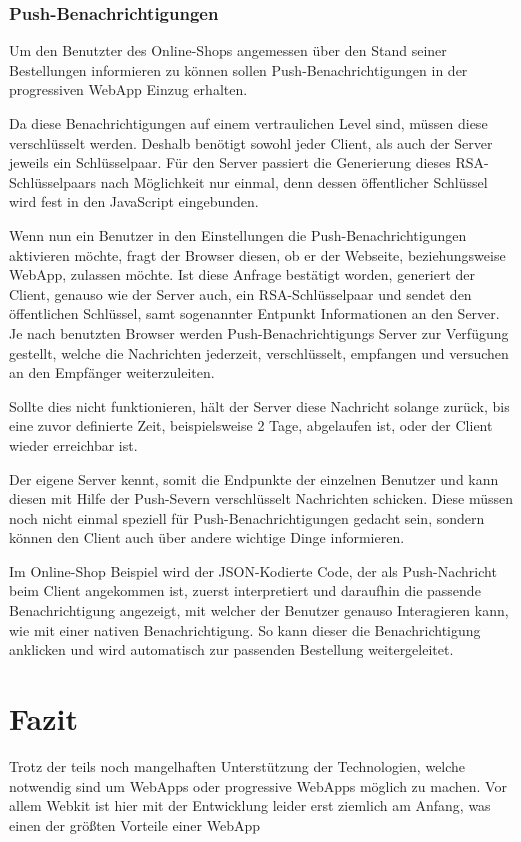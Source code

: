 \documentclass[a4paper,12pt,ngerman,listof=numbered]{scrartcl}      %
\begin{document}
	\subsubsection{Push-Benachrichtigungen}
	Um den Benutzter des Online-Shops angemessen über den Stand seiner Bestellungen informieren zu können sollen Push-Benachrichtigungen in der progres\-siven WebApp Einzug erhalten.\par
	Da diese Benachrichtigungen auf einem vertraulichen Level sind, müssen diese verschlüsselt werden. Deshalb benötigt sowohl jeder Client, als auch der Server jeweils ein Schlüsselpaar. Für den Server passiert die Generierung dieses RSA-Schlüsselpaars nach Möglichkeit nur einmal, denn dessen öffentlicher Schlüssel wird fest in den JavaScript eingebunden.\par
	Wenn nun ein Benutzer in den Einstellungen die Push-Be\-nach\-rich\-ti\-gungen aktivieren möchte, fragt der Browser diesen, ob er der Webseite, beziehungsweise WebApp, zulassen möchte. Ist diese Anfrage bestätigt worden, generiert der Client, genauso wie der Server auch, ein RSA-Schlüsselpaar und sendet den öffentlichen Schlüssel, samt sogenannter Entpunkt Informationen an den Server. Je nach benutzten Browser werden Push-Benachrichtigungs Server zur Verfügung gestellt, welche die Nachrichten jederzeit, verschlüsselt, empfangen und versuchen an den Empfänger weiterzuleiten.\par
	Sollte dies nicht funktionieren, hält der Server diese Nachricht solange zurück, bis eine zuvor definierte Zeit, beispielsweise 2 Tage, abgelaufen ist, oder der Client wieder erreichbar ist.\par
	Der eigene Server kennt, somit die Endpunkte der einzelnen Benutzer und kann diesen mit Hilfe der Push-Severn verschlüsselt Nachrichten schicken. Diese müs\-sen noch nicht einmal speziell für Push-Be\-nach\-rich\-ti\-gungen gedacht sein, sondern können den Client auch über andere wichtige Dinge informieren.\par
	Im Online-Shop Beispiel wird der JSON-Kodierte Code, der als Push-Nachricht beim Client angekommen ist, zuerst interpretiert und daraufhin die passende Benachrichtigung angezeigt, mit welcher der Benutzer genauso Interagieren kann, wie mit einer nativen Benachrichtigung. So kann dieser die Benachrichtigung an\-klicken und wird automatisch zur passenden Bestellung weitergeleitet.\par
	
	\section{Fazit}
	Trotz der teils noch mangelhaften Unterstützung der Technologien, welche notwendig sind um WebApps oder progressive WebApps möglich zu machen. Vor allem Webkit ist hier mit der Entwicklung leider erst ziemlich am Anfang, was einen der größten Vorteile einer WebApp 
	
\end{document}
